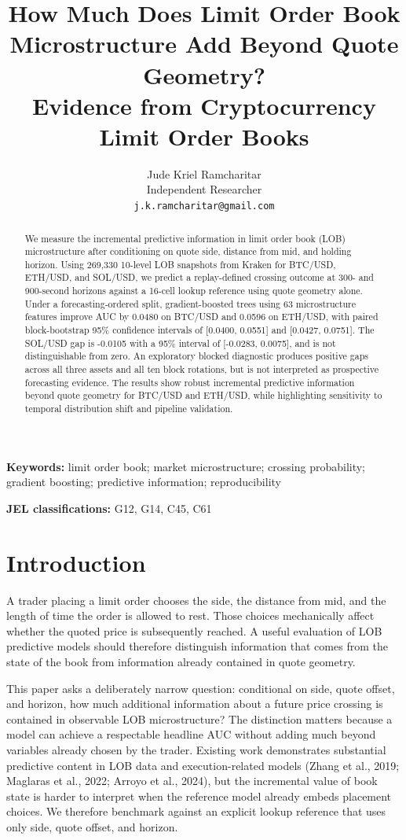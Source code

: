 \documentclass[11pt]{article}
\title{\textbf{How Much Does Limit Order Book Microstructure Add Beyond Quote Geometry?}\\[0.35em]
\large Evidence from Cryptocurrency Limit Order Books}
\author{Jude Kriel Ramcharitar\\\small Independent Researcher\\\small \texttt{j.k.ramcharitar@gmail.com}}
\date{}
\begin{document}
\maketitle

\begin{abstract}
We measure the incremental predictive information in limit order book (LOB) microstructure after conditioning on quote side, distance from mid, and holding horizon. Using 269,330 10-level LOB snapshots from Kraken for BTC/USD, ETH/USD, and SOL/USD, we predict a replay-defined crossing outcome at 300- and 900-second horizons against a 16-cell lookup reference using quote geometry alone. Under a forecasting-ordered split, gradient-boosted trees using 63 microstructure features improve AUC by 0.0480 on BTC/USD and 0.0596 on ETH/USD, with paired block-bootstrap 95\% confidence intervals of [0.0400, 0.0551] and [0.0427, 0.0751]. The SOL/USD gap is -0.0105 with a 95\% interval of [-0.0283, 0.0075], and is not distinguishable from zero. An exploratory blocked diagnostic produces positive gaps across all three assets and all ten block rotations, but is not interpreted as prospective forecasting evidence. The results show robust incremental predictive information beyond quote geometry for BTC/USD and ETH/USD, while highlighting sensitivity to temporal distribution shift and pipeline validation.
\end{abstract}

\noindent\textbf{Keywords:} limit order book; market microstructure; crossing probability; gradient boosting; predictive information; reproducibility

\medskip
\noindent\textbf{JEL classifications:} G12, G14, C45, C61

\section{Introduction}
A trader placing a limit order chooses the side, the distance from mid, and the length of time the order is allowed to rest. Those choices mechanically affect whether the quoted price is subsequently reached. A useful evaluation of LOB predictive models should therefore distinguish information that comes from the state of the book from information already contained in quote geometry.

This paper asks a deliberately narrow question: conditional on side, quote offset, and horizon, how much additional information about a future price crossing is contained in observable LOB microstructure? The distinction matters because a model can achieve a respectable headline AUC without adding much beyond variables already chosen by the trader. Existing work demonstrates substantial predictive content in LOB data and execution-related models (Zhang et al., 2019; Maglaras et al., 2022; Arroyo et al., 2024), but the incremental value of book state is harder to interpret when the reference model already embeds placement choices. We therefore benchmark against an explicit lookup reference that uses only side, quote offset, and horizon.
\end{document}

